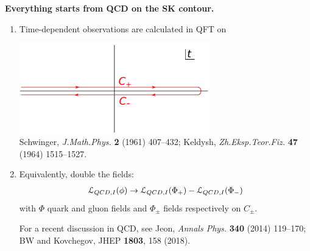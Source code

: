 \documentclass[9pt,a4paper,unknownkeysallowed,xcolor=dvipsnames,aspectratio=43]{beamer}
\begin{document}
%
%
\begin{frame}{\bf\huge Everything starts from QCD on the SK contour.}	\vspace{2mm}
\begin{enumerate}
\item{\large Time-dependent observations are calculated in QFT on}
\vspace{2mm}
\begin{center}
\includegraphics[width=0.65\textwidth]{fig/SKcontour}\\
{\tiny {\color{teablue}
Schwinger, {\emph{J.Math.Phys.} {\bfseries 2}
  (1961) 407--432}; Keldysh,
  {\emph{Zh.Eksp.Teor.Fiz.} {\bfseries 47} (1964) 1515--1527}.
  }}
\end{center}
\vspace{2mm}
\item{\large Equivalently, double the fields:}
\begin{align}
    \mathcal{L}_{QCD, I}(\phi)\to \mathcal{L}_{QCD, I}(\Phi_{+}) - \mathcal{L}_{QCD, I}(\Phi_{-})\notag
\end{align}
with $\Phi$ quark and gluon fields and $\Phi_\pm$ fields respectively on $C_\pm$.\\
\begin{center}
{\tiny For a recent discussion in QCD, see {\color{teablue}
 Jeon, {\emph{Annals Phys.}
  {\bfseries 340} (2014) 119--170};   BW and Kovchegov,
  JHEP {\bf 1803}, 158 (2018).
  }}
\end{center}
\end{enumerate}
\end{frame}
\end{document}
